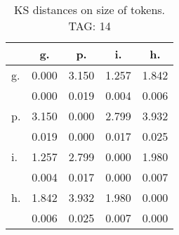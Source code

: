 \begin{table}[h!]
\begin{center}
\begin{tabular}{| l | c | c | c | c |}\hline
 & g. & p. & i. & h. \\\hline
g. & 0.000  & 3.150  & 1.257  & 1.842 \\\hline
 & 0.000  & 0.019  & 0.004  & 0.006 \\\hline
p. & 3.150  & 0.000  & 2.799  & 3.932 \\\hline
 & 0.019  & 0.000  & 0.017  & 0.025 \\\hline
i. & 1.257  & 2.799  & 0.000  & 1.980 \\\hline
 & 0.004  & 0.017  & 0.000  & 0.007 \\\hline
h. & 1.842  & 3.932  & 1.980  & 0.000 \\\hline
 & 0.006  & 0.025  & 0.007  & 0.000 \\\hline
\end{tabular}
\caption{KS distances on size of tokens. TAG: 14}
\end{center}
\end{table}
